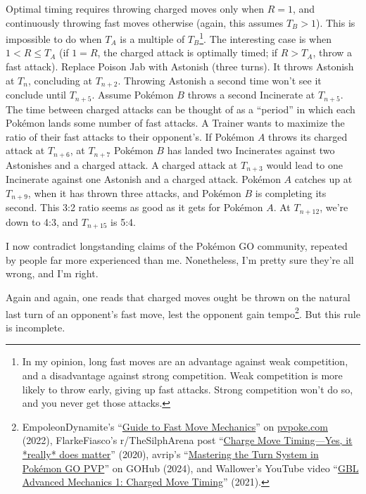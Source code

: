 Optimal timing requires throwing charged moves only when $R=1$, and continuously throwing fast moves otherwise
 (again, this assumes $T_B > 1$).
This is impossible to do when $T_A$ is a multiple of $T_B$\footnote{In my opinion, long fast moves are an advantage against weak competition, and a disadvantage
 against strong competition. Weak competition is more likely to throw early, giving up fast attacks. Strong competition
 won't do so, and you never get those attacks.}.
 The interesting case is when $1 < R \le T_A$ (if $1=R$, the charged attack is optimally timed; if $R > T_A$, throw a fast attack).
Replace Poison Jab with Astonish (three turns).
It throws Astonish at $T_n$, concluding at $T_{n+2}$.
Throwing Astonish a second time won't see it conclude until $T_{n+5}$.
Assume Pokémon $B$ throws a second Incinerate at $T_{n+5}$.
The time between charged attacks can be thought of as a ``period''
 in which each Pokémon lands some number of fast attacks.
A Trainer wants to maximize the ratio of their fast attacks to their opponent's.
If Pokémon $A$ throws its charged attack at $T_{n+6}$, at $T_{n+7}$ Pokémon $B$ has landed two Incinerates
  against two Astonishes and a charged attack.
A charged attack at $T_{n+3}$ would lead to one Incinerate against one Astonish
  and a charged attack.
Pokémon $A$ catches up at $T_{n+9}$, when it has thrown three attacks, and Pokémon $B$ is
  completing its second.
This 3:2 ratio seems as good as it gets for Pokémon $A$.
At $T_{n+12}$, we're down to 4:3, and $T_{n+15}$ is 5:4.

\begin{tipbox}[title=Warning! Achtung! \begin{chinese}危险！\end{chinese} ¡Peligro! \begin{japanese}危険!\end{japanese} \textit{Tulaga faigata!}]
I now contradict longstanding claims of the Pokémon GO community, repeated by
  people far more experienced than me.
Nonetheless, I'm pretty sure they're all wrong, and I'm right.
\end{tipbox}
\noindent{}Again and again, one reads that charged moves ought be thrown on the natural last turn of an
 opponent's fast move, lest the opponent gain tempo\footnote{EmpoleonDynamite's ``\href{https://pvpoke.com/articles/strategy/guide-to-fast-move-registration/}{Guide to Fast Move Mechanics}''
 on \href{https://pvpoke.com}{pvpoke.com} (2022), FlarkeFiasco's r/TheSilphArena post ``\href{reddit.com/r/TheSilphArena/comments/fvu62a/charge\_move\_timing\_yes\_it\_really\_does\_matter/}{Charge Move Timing---Yes, it *really* does matter}'' (2020),
 avrip's ``\href{https://pokemongohub.net/post/pvp/mastering-the-turn-system-in-pokemon-go-pvp/}{Mastering the Turn System in Pokémon GO PVP}'' on GOHub (2024),
 and Wallower's YouTube video ``\href{https://www.youtube.com/watch?v=pAtCo8xg700}{GBL Advanced Mechanics 1: Charged Move Timing}'' (2021).}.
But this rule is incomplete.

